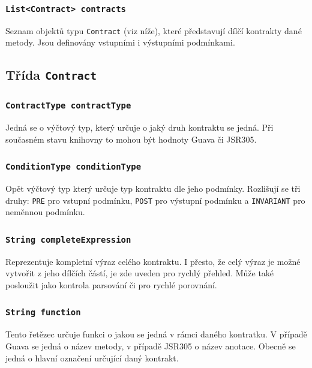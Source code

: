 				\subsubsection{\texttt{List<Contract> contracts}}
					Seznam objektů typu \texttt{Contract} (viz níže), které představují dílčí kontrakty dané metody. Jsou definovány vstupními i výstupními podmínkami.
						
			
			\subsection{Třída \texttt{Contract}}			
			
				\subsubsection{\texttt{ContractType contractType}} 
					Jedná se o výčtový typ, který určuje o jaký druh kontraktu se jedná. Při současném stavu knihovny to mohou být hodnoty Guava či JSR305.
			
				\subsubsection{\texttt{ConditionType conditionType}} 
					Opět výčtový typ který určuje typ kontraktu dle jeho podmínky. Rozlišují se tři druhy: \texttt{PRE} pro vstupní podmínku, \texttt{POST} pro výstupní podmínku a \texttt{INVARIANT} pro neměnnou podmínku.
			
				\subsubsection{\texttt{String completeExpression}} 
					Reprezentuje kompletní výraz celého kontraktu. I přesto, že celý výraz je možné vytvořit z jeho dílčích částí, je zde uveden pro rychlý přehled. Může také posloužit jako kontrola parsování či pro rychlé porovnání.
			
				\subsubsection{\texttt{String function}} 
					Tento řetězec určuje funkci o jakou se jedná v rámci daného kontratku. V případě Guava se jedná o název metody, v případě JSR305 o název anotace. Obecně se jedná o hlavní označení určující daný kontrakt.
			
